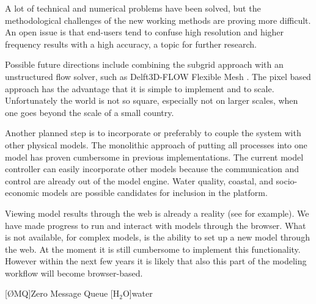\documentclass[a4paper]{article}
\begin{document}
A lot of technical and numerical problems have been solved, but the methodological challenges of the new working methods are proving more difficult. An open issue is that end-users tend to confuse high resolution and higher frequency results with a high accuracy, a topic for further research.

Possible future directions include combining the subgrid approach with an unstructured flow solver, such as Delft3D-FLOW Flexible Mesh \citep{Kernkamp2011}. The pixel based approach has the advantage that it is simple to implement and to scale. Unfortunately the world is not so square, especially not on larger scales, when one goes beyond the scale of a small country.

Another planned step is to incorporate or preferably to couple the system with other physical models. The monolithic approach of putting all processes into one model has proven cumbersome in previous implementations. The current model controller can easily incorporate other models because the communication and control are already out of the model engine. Water quality, coastal, and socio-economic models are possible candidates for inclusion in the platform.

Viewing model results through the web is already a reality (see \citep{Blower2013} for example). We have made progress to run and interact with models through the browser. What is not available, for complex models, is the ability to set up a new model through the web. At the moment it is still cumbersome to implement this functionality. However within the next few years it is likely that also this part of the modeling workflow will become browser-based.



\begin{acronym}[AAAAA]
[\O{}MQ]{Zero Message Queue}
[$\mathrm{H_2O}$]{water}
\end{acronym}
\end{document}
